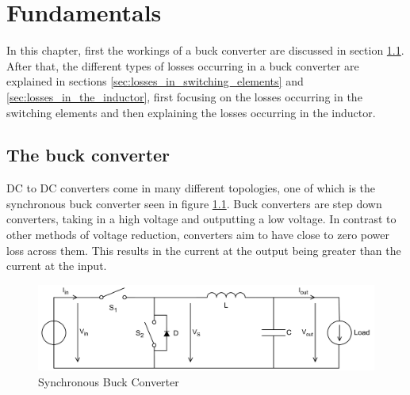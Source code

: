 
\chapter{Fundamentals} \label{sec:fundamentals}
In this chapter, first the workings of a buck converter are discussed in section \ref{sec:the_buck_converter}. After that, the different types of losses occurring in a buck converter are explained in sections \ref{sec:losses_in_switching_elements} and \ref{sec:losses_in_the_inductor}, first focusing on the losses occurring in the switching elements and then explaining the losses occurring in the inductor. 
\section{The buck converter}
\label{sec:the_buck_converter}
DC to DC converters come in many different topologies, one of which is the synchronous buck converter seen in figure \ref{fig:synch_buck_converter_2}. Buck converters are step down converters, taking in a high voltage and outputting a low voltage. In contrast to other methods of voltage reduction, converters aim to have close to zero power loss across them. This results in the current at the output being greater than the current at the input. \\
\begin{figure}[H]
    \centering
    \includegraphics[width=1\linewidth]{Bilder//Kapitel2/SBC_2_D.pdf}
    \caption{Synchronous Buck Converter}
    \label{fig:synch_buck_converter_2}
\end{figure}
